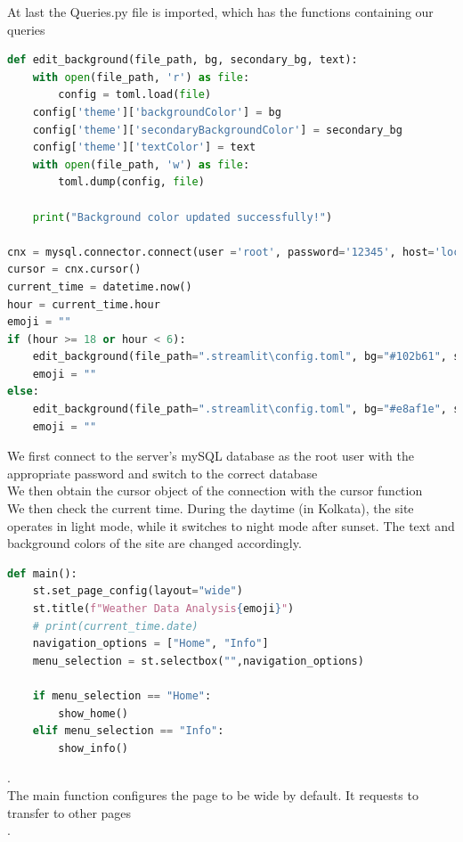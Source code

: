 \documentclass[12pt, a4paper]{article}
\begin{document}
At last the Queries.py file is imported, which has the functions containing our queries
\newpage
\begin{lstlisting}[language=Python, breaklines=true]
def edit_background(file_path, bg, secondary_bg, text):
    with open(file_path, 'r') as file:
        config = toml.load(file)
    config['theme']['backgroundColor'] = bg
    config['theme']['secondaryBackgroundColor'] = secondary_bg
    config['theme']['textColor'] = text
    with open(file_path, 'w') as file:
        toml.dump(config, file)

    print("Background color updated successfully!")

cnx = mysql.connector.connect(user ='root', password='12345', host='localhost', database='kolkata_weather')
cursor = cnx.cursor()
current_time = datetime.now()
hour = current_time.hour
emoji = ""
if (hour >= 18 or hour < 6):
    edit_background(file_path=".streamlit\config.toml", bg="#102b61", secondary_bg="#061024", text="ffffff")
    emoji = ""
else:
    edit_background(file_path=".streamlit\config.toml", bg="#e8af1e", secondary_bg="#c9a444", text="#141414")
    emoji = ""
\end{lstlisting}
We first connect to the server's mySQL database as the root user with the appropriate password and switch to the correct database\\

We then obtain the cursor object of the connection with the cursor function\\

We then check the current time. During the daytime (in Kolkata), the site operates in light mode, while it switches to night mode after sunset. The text and background colors of the site are changed accordingly.
\newpage
\begin{lstlisting}[language=Python, breaklines=true]
def main():
    st.set_page_config(layout="wide")
    st.title(f"Weather Data Analysis{emoji}")    
    # print(current_time.date)
    navigation_options = ["Home", "Info"]
    menu_selection = st.selectbox("",navigation_options)
    
    if menu_selection == "Home":
        show_home()
    elif menu_selection == "Info":
        show_info()
\end{lstlisting}
.\\
The main function configures the page to be wide by default. It requests to transfer to other pages\\

.\\
\end{document}
